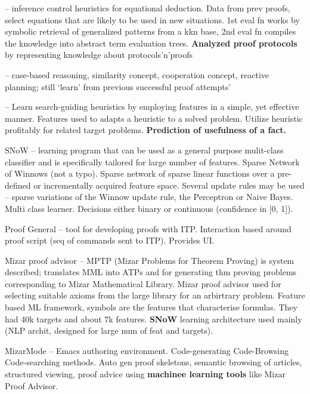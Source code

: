 \documentclass{article}
\begin{document}
\cite{DomKnThmProv} -- inference control heuristics for equational deduction.
Data from prev proofs, select equations that are likely to be used in new
situations. 1st eval fn works by symbolic retrieval of generalized patterns
from a kkn base, 2nd eval fn compiles the knowledge into abstract term
evaluation trees. \textbf{Analyzed proof protocols} by representing knowledge
about protocols'n'proofs 

\cite{HighPerfATPAI} -- case-based reasoning, similarity concept, cooperation
concept, reactive planning; still `learn' from previous successful proof
attempts'

\cite{FeatureBasedThmP} -- Learn search-guiding heuristics by employing
features in a simple, yet effective manner. Features used to adapts a heuristic
to a solved problem. Utilize heuristic profitably for related target problems.
\textbf{Prediction of usefulness of a fact.} 

SNoW \cite{SNoW} -- learning program that can be used as a general purpose
mulit-class classifier and is specifically tailored for large number of
features. Sparse Network of Winnows (not a typo). Sparse network of sparse
linear functions over a pre-defined or incrementally acquired feature space.
Several update rules may be used -- sparse variations of the Winnow update
rule, the Perceptron or Naive Bayes. Multi class learner. Decisions either
binary or continuous (confidence in [0, 1]).

Proof General \cite{ProofGeneral} -- tool for developing proofs with ITP.
Interaction based around proof script (seq of commands sent to ITP). Provides
UI.

Mizar proof advisor \cite{MizarProofAdvisor} -- MPTP (Mizar Problems for
Theorem Proving) is system described; translates MML into ATPs and for
generating thm proving problems corresponding to Mizar Mathematical Library.
Mizar proof advisor used for selecting suitable axioms from the large library
for an arbirtrary problem. Feature based ML framework, symbols are the features
that characterise formulas. They had 40k targets and about 7k features.
\textbf{SNoW} learning architecture used mainly (NLP archit, designed for large
num of feat and targets).

MizarMode \cite{MizarMode} -- Emacs authoring environment. Code-generating
Code-Browsing Code-searching methods. Auto gen proof skeletons, semantic
browsing of articles, structured viewing, proof advice using \textbf{machinee
learning tools} like Mizar Proof Advisor. 
\end{document}
